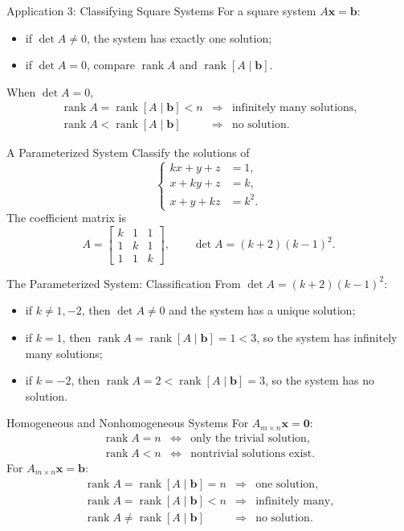 \documentclass[aspectratio=169]{beamer}
\newcommand{\vect}[1]{\mathbf{#1}}
\newcommand{\rank}{\operatorname{rank}}
\begin{document}
\begin{frame}{Application 3: Classifying Square Systems}
For a square system $A\vect x=\vect b$:
\begin{itemize}
  \item if $\det A\ne0$, the system has exactly one solution;
  \item if $\det A=0$, compare $\rank A$ and $\rank[A\mid\vect b]$.
\end{itemize}
\pause
When $\det A=0$,
\[
\begin{array}{ccl}
\rank A=\rank[A\mid\vect b]<n &\Longrightarrow& \text{infinitely many solutions},\\[1ex]
\rank A<\rank[A\mid\vect b] &\Longrightarrow& \text{no solution}.
\end{array}
\]
\end{frame}

\begin{frame}{A Parameterized System}
Classify the solutions of
\[
\left\{\begin{aligned}
kx+y+z&=1,\\
x+ky+z&=k,\\
x+y+kz&=k^2.
\end{aligned}\right.
\]
The coefficient matrix is
\[
A=\begin{bmatrix}k&1&1\\1&k&1\\1&1&k\end{bmatrix},
\qquad
\det A=(k+2)(k-1)^2.
\]
\end{frame}

\begin{frame}{The Parameterized System: Classification}
From $\det A=(k+2)(k-1)^2$:
\begin{itemize}
  \item if $k\ne1,-2$, then $\det A\ne0$ and the system has a unique solution;
  \item if $k=1$, then $\rank A=\rank[A\mid\vect b]=1<3$, so the system has infinitely many solutions;
  \item if $k=-2$, then $\rank A=2<\rank[A\mid\vect b]=3$, so the system has no solution.
\end{itemize}
\end{frame}

\begin{frame}{Homogeneous and Nonhomogeneous Systems}
For $A_{m\times n}\vect x=\vect0$:
\[
\begin{array}{ccl}
\rank A=n &\Longleftrightarrow& \text{only the trivial solution},\\
\rank A<n &\Longleftrightarrow& \text{nontrivial solutions exist}.
\end{array}
\]
For $A_{m\times n}\vect x=\vect b$:
\[
\begin{array}{ccl}
\rank A=\rank[A\mid\vect b]=n &\Longrightarrow& \text{one solution},\\
\rank A=\rank[A\mid\vect b]<n &\Longrightarrow& \text{infinitely many},\\
\rank A\ne\rank[A\mid\vect b] &\Longrightarrow& \text{no solution}.
\end{array}
\]
\end{frame}
\end{document}
